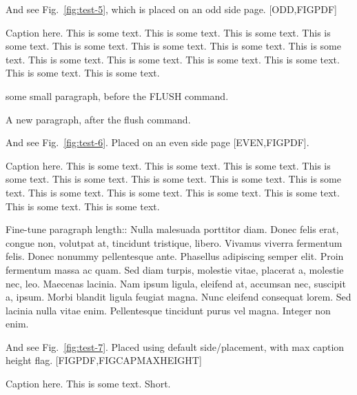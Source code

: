 \documentclass[12pt,a5paper]{book}
\begin{document}
\lipsum[5-7]


\cleardoublepage
\lipsum[1-3]

And see Fig.~\ref{fig:test-5}, which is placed on an odd side page. [ODD,FIGPDF]

\begin{fullpagefigure}
  \caption{Caption here. This is some text. This is some text. This is some text. This is
    some text. This is some text. This is some text. This is some text. This is some
    text. This is some text. This is some text. This is some text. This is some text. This
    is some text. This is some text. }
  \label{fig:test-5}
\end{fullpagefigure}

some small paragraph, before the FLUSH command.

\FlushAllFullPageFigures

A new paragraph, after the flush command.

\lipsum[5-7]


\cleardoublepage
\lipsum[1-3]

And see Fig.~\ref{fig:test-6}. Placed on an even side page [EVEN,FIGPDF].

\begin{fullpagefigure}
  \caption{Caption here. This is some text. This is some text. This is some text. This is
    some text. This is some text. This is some text. This is some text. This is some
    text. This is some text. This is some text. This is some text. This is some text. This
    is some text. This is some text. }
  \label{fig:test-6}
\end{fullpagefigure}

\lipsum[5-7]


\cleardoublepage
\lipsum[1-2]

Fine-tune paragraph length:: Nulla malesuada porttitor diam. Donec felis erat, congue non,
volutpat at, tincidunt tristique, libero. Vivamus viverra fermentum felis. Donec nonummy
pellentesque ante. Phasellus adipiscing semper elit. Proin fermentum massa ac quam. Sed
diam turpis, molestie vitae, placerat a, molestie nec, leo. Maecenas lacinia. Nam ipsum
ligula, eleifend at, accumsan nec, suscipit a, ipsum. Morbi blandit ligula feugiat
magna. Nunc eleifend consequat lorem. Sed lacinia nulla vitae enim. Pellentesque tincidunt
purus vel magna. Integer non enim.

And see Fig.~\ref{fig:test-7}. Placed using default side/placement, with max caption
height flag. [FIGPDF,FIGCAPMAXHEIGHT]

\begin{fullpagefigure}
  \figcapmaxheight{10em}
  \caption{Caption here. This is some text. Short.}
  \label{fig:test-7}
\end{fullpagefigure}

\lipsum[5-11]
\end{document}
